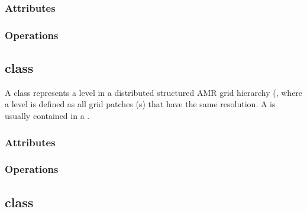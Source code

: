 \documentclass{article}
\begin{document}
\subsubsection{Attributes}

\subsubsection{Operations}

\subsection{ class}

A  class represents a level in a distributed structured
AMR grid hierarchy (, where a level is defined as all
grid patches (s) that have the same resolution.  A
 is usually contained in a .


\subsubsection{Attributes}

\subsubsection{Operations}

\subsection{ class}
\end{document}
